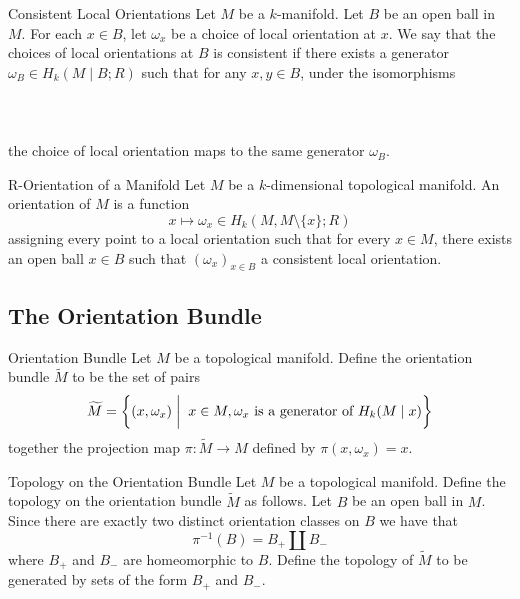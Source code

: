 \documentclass[a4paper]{article}
\begin{document}
\begin{defn}{Consistent Local Orientations}{} Let $M$ be a $k$-manifold. Let $B$ be an open ball in $M$. For each $x\in B$, let $\omega_x$ be a choice of local orientation at $x$. We say that the choices of local orientations at $B$ is consistent if there exists a generator $\omega_B\in H_k(M\;|\; B;R)$ such that for any $x,y\in B$, under the isomorphisms \\~\\
\\~\\
the choice of local orientation maps to the same generator $\omega_B$. 
\end{defn}

\begin{defn}{R-Orientation of a Manifold}{} Let $M$ be a $k$-dimensional topological manifold. An orientation of $M$ is a function $$x\mapsto\omega_x\in H_k(M,M\setminus\{x\};R)$$ assigning every point to a local orientation such that for every $x\in M$, there exists an open ball $x\in B$ such that $(\omega_x)_{x\in B}$ a consistent local orientation. 
\end{defn}

\subsection{The Orientation Bundle}
\begin{defn}{Orientation Bundle}{} Let $M$ be a topological manifold. Define the orientation bundle $\widetilde{M}$ to be the set of pairs $$\widetilde{M}=\left\{(x,\omega_x)\;\bigg{|}\;\; x\in M, \omega_x\text{ is a generator of }H_k(M\;|\; x)\right\}$$ together the projection map $\pi:\widetilde{M}\to M$ defined by $\pi(x,\omega_x)=x$. 
\end{defn}

\begin{defn}{Topology on the Orientation Bundle}{} Let $M$ be a topological manifold. Define the topology on the orientation bundle $\widetilde{M}$ as follows. Let $B$ be an open ball in $M$. Since there are exactly two distinct orientation classes on $B$ we have that $$\pi^{-1}(B)=B_+\amalg B_-$$ where $B_+$ and $B_-$ are homeomorphic to $B$. Define the topology of $\widetilde{M}$ to be generated by sets of the form $B_+$ and $B_-$. 
\end{defn}
\end{document}
